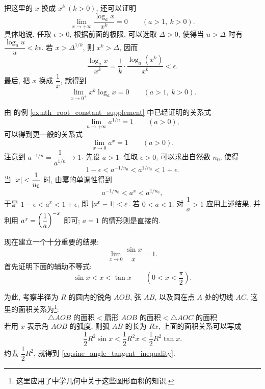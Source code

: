 把这里的 $x$ 换成 $x^k\ (k>0)$, 还可以证明
$$
\lim_{x\to+\infty}\frac{\log_a x}{x^k}=0
\qquad(a>1,\ k>0).
$$
具体地说, 任取 $\epsilon>0$, 根据前面的极限, 可以选取 $\Delta>0$,
使得当 $u>\Delta$ 时有 $\dfrac{\log_a u}{u}<k\epsilon$.
若 $x>\Delta^{1/k}$, 则 $x^k>\Delta$, 因而
$$
\frac{\log_a x}{x^k}
=\frac1k\cdot\frac{\log_a(x^k)}{x^k}<\epsilon.
$$
最后, 把 $x$ 换成 $\dfrac1x$, 就得到
$$
\lim_{x\to0^+}x^k\log_a x=0\qquad(a>1,\ k>0).
$$

\label{ex:exponential_limit_at_zero}
由  的例 \ref{ex:nth_root_constant_supplement} 中已经证明的关系式
$$
\lim_{n\to+\infty}a^{1/n}=1\qquad(a>0),
$$
可以得到更一般的关系式
$$
\lim_{x\to0}a^x=1\qquad(a>0).
$$
注意到 $a^{-1/n}=\dfrac1{a^{1/n}}\to1$.
先设 $a>1$. 任取 $\epsilon>0$, 可以求出自然数 $n_0$, 使得
$$
1-\epsilon<a^{-1/n_0}<a^{1/n_0}<1+\epsilon.
$$
当 $\left| x \right|<\dfrac1{n_0}$ 时, 由幂的单调性得到
$$
a^{-1/n_0}<a^x<a^{1/n_0},
$$
于是 $1-\epsilon<a^x<1+\epsilon$, 即 $\left| a^x-1 \right|<\varepsilon$.
若 $0<a<1$, 对 $\dfrac1a>1$ 应用上述结果, 并利用
$a^x=\left( \dfrac1a \right)^{-x}$ 即可; $a=1$ 的情形则是直接的.

\label{ex:sine_over_argument_limit}
现在建立一个十分重要的结果:
\begin{equation}\label{eq:sine_over_argument_limit}
\lim_{x\to0}\frac{\sin x}{x}=1.
\end{equation}
首先证明下面的辅助不等式:
\begin{equation}\label{eq:sine_angle_tangent_inequality}
\sin x<x<\tan x\qquad\left(0<x<\frac\pi2\right).
\end{equation}

\begin{figure}
    \vspace{-1.5cm}
\end{figure}
为此, 考察半径为 $R$ 的圆内的锐角 $AOB$, 弦 $AB$,
以及圆在点 $A$ 处的切线 $AC$.
这里的面积关系为\footnote{这里应用了中学几何中关于这些图形面积的知识.}:
$$
\triangle AOB\text{ 的面积}
<\text{扇形 }AOB\text{ 的面积}
<\triangle AOC\text{ 的面积}
$$
若用 $x$ 表示角 $AOB$ 的弧度, 则弧 $AB$ 的长为 $Rx$,
上面的面积关系可以写成
$$
\frac12R^2\sin x<\frac12R^2x<\frac12R^2\tan x.
$$
约去 $\dfrac12R^2$, 就得到 \eqref{eq:sine_angle_tangent_inequality}.



